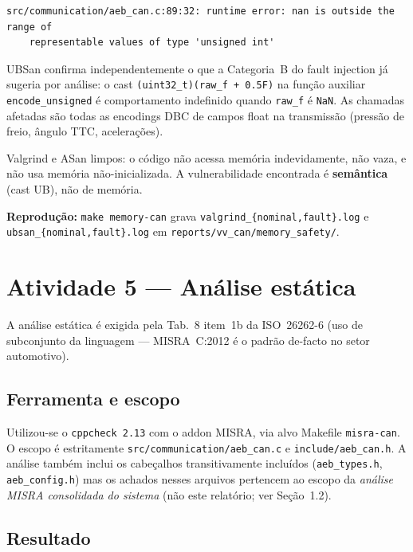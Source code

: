 \documentclass[12pt]{article}
\begin{document}
\begin{lstlisting}[language={}, caption={Diagnóstico UBSan encontrado na suíte de fault injection.}]
src/communication/aeb_can.c:89:32: runtime error: nan is outside the range of
    representable values of type 'unsigned int'
\end{lstlisting}

UBSan confirma independentemente o que a Categoria~B do fault injection já sugeria por análise: o cast
\texttt{(uint32\_t)(raw\_f + 0.5F)} na função auxiliar \texttt{encode\_unsigned} é comportamento
indefinido quando \texttt{raw\_f} é \texttt{NaN}. As chamadas afetadas são todas as encodings DBC de
campos float na transmissão (pressão de freio, ângulo TTC, acelerações).

Valgrind e ASan limpos: o código não acessa memória indevidamente, não vaza, e não usa memória
não-inicializada. A vulnerabilidade encontrada é \textbf{semântica} (cast UB), não de memória.

\textbf{Reprodução:} \texttt{make memory-can} grava \texttt{valgrind\_\{nominal,fault\}.log} e
\texttt{ubsan\_\{nominal,fault\}.log} em \texttt{reports/vv\_can/memory\_safety/}.

\section{Atividade 5 --- Análise estática}
\label{sec:misra}

A análise estática é exigida pela Tab.~8 item~1b da ISO~26262-6 (uso de subconjunto da linguagem ---
MISRA~C:2012 é o padrão de-facto no setor automotivo).

\subsection{Ferramenta e escopo}

Utilizou-se o \texttt{cppcheck 2.13} com o addon MISRA, via alvo Makefile \texttt{misra-can}. O escopo é
estritamente \texttt{src/communication/aeb\_can.c} e \texttt{include/aeb\_can.h}. A análise também
inclui os cabeçalhos transitivamente incluídos (\texttt{aeb\_types.h}, \texttt{aeb\_config.h}) mas os
achados nesses arquivos pertencem ao escopo da \textit{análise MISRA consolidada do sistema}
(não este relatório; ver Seção~1.2).

\subsection{Resultado}
\end{document}
